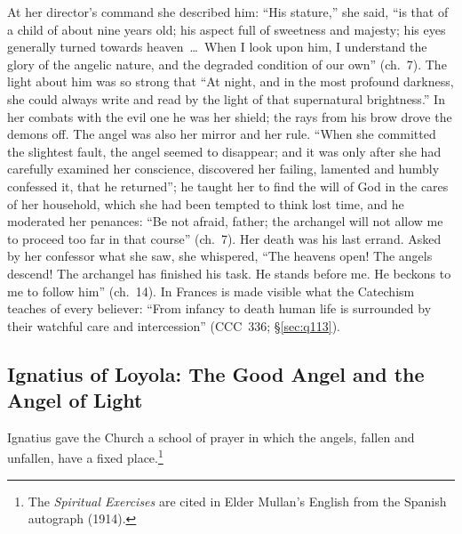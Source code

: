 At her director's command she described him: ``His stature,'' she said,
``is that of a child of about nine years old; his aspect full of sweetness
and majesty; his eyes generally turned towards heaven~\dots\ When I look upon
him, I understand the glory of the angelic nature, and the degraded
condition of our own'' (ch.~7). The light about him was so strong that ``At
night, and in the most profound darkness, she could always write and read
by the light of that supernatural brightness.'' In her combats with the
evil one he was her shield; the rays from his brow drove the demons off. The
angel was also her mirror and her rule. ``When she committed the slightest
fault, the angel seemed to disappear; and it was only after she had
carefully examined her conscience, discovered her failing, lamented and
humbly confessed it, that he returned''; he taught her to find the will of
God in the cares of her household, which she had been tempted to think lost
time, and he moderated her penances: ``Be not afraid, father; the archangel
will not allow me to proceed too far in that course'' (ch.~7). Her death was
his last errand. Asked by her confessor what she saw, she whispered, ``The
heavens open! The angels descend! The archangel has finished his task. He
stands before me. He beckons to me to follow him'' (ch.~14). In Frances is
made visible what the Catechism teaches of every believer: ``From infancy
to death human life is surrounded by their watchful care and intercession''
(CCC~336; \S\ref{sec:q113}).

\sectionguard\subsection{Ignatius of Loyola: The Good Angel and the Angel of
Light}\label{sec:sa-ignatius}

Ignatius gave the Church a school of prayer in which the angels, fallen and
unfallen, have a fixed place.\footnote{The \emph{Spiritual Exercises} are
cited in Elder Mullan's English from the Spanish autograph (1914).}


